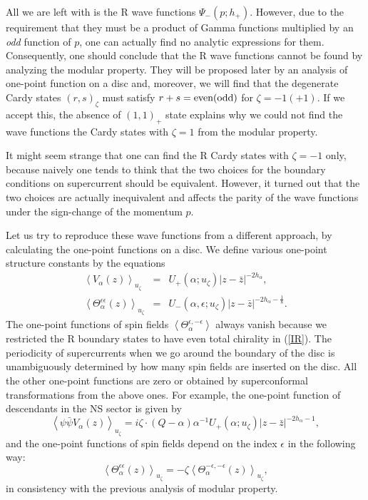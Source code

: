 \documentclass[a4paper,12pt]{article}
\def\subsection#1{\addtocounter{subsection}{1}
    \vskip6mm\noindent{\sc\thesubsection~#1}\vskip4mm}
\newcommand{\vev}[1]{\left<{#1}\right>}
\newcommand{\ep}{{\epsilon}}
\begin{document}
 All we are left with is the R wave functions $\Psi_-(p;h_+)$.
 However, due to the requirement that they must be a product of
 Gamma functions multiplied by an {\it odd} function of $p$,
 one can actually find no analytic expressions for them.
 Consequently, one should conclude that the R 
 wave functions cannot be found by analyzing the modular property.
 They will be proposed later by an analysis of one-point function
 on a disc and, moreover, we will find that the degenerate Cardy
 states $(r,s)_\zeta$ must satisfy $r+s={\rm even(odd)}$ for
 $\zeta=-1(+1)$.
 If we accept this, the absence of $(1,1)_+$ state explains
 why we could not find the wave functions the Cardy states with
 $\zeta=1$ from the modular property.

   It might seem strange that one can find the R Cardy states
 with $\zeta=-1$ only, because naively one tends to think that the two
 choices for the boundary conditions on supercurrent should be
 equivalent.
 However, it turned out that the two choices are actually
 inequivalent and affects the parity of the wave functions
 under the sign-change of the momentum $p$.

\subsection{One-point functions of bulk operators}

   Let us try to reproduce these wave functions from a different
 approach, by calculating the one-point functions on a disc.
 We define various one-point structure constants by the equations
\begin{eqnarray}
  \vev{V_\alpha(z)}_{u_\zeta}
 &=& U_+(\alpha;u_\zeta)|z-\bar{z}|^{-2h_\alpha},
\nonumber \\
  \vev{\Theta_\alpha^{\ep\ep}(z)}_{u_\zeta}
 &=& U_-(\alpha,\ep;u_\zeta)|z-\bar{z}|^{-2h_\alpha-\frac{1}{8}}.
\end{eqnarray}
 The one-point functions of spin fields $\vev{\Theta_\alpha^{\ep,-\ep}}$
 always vanish because we restricted the R boundary states
 to have even total chirality in (\ref{IR}).
 The periodicity of supercurrents when we go around the boundary
 of the disc is unambiguously determined by how many spin fields are
 inserted on the disc.
 All the other one-point functions are zero or obtained 
 by superconformal transformations from the above ones.
 For example, the one-point function of descendants
 in the NS sector is given by
\begin{equation}
  \vev{\psi\bar{\psi}V_\alpha(z)}_{u_\zeta}
 = i\zeta\cdot(Q-\alpha)\alpha^{-1}
   U_+(\alpha;u_\zeta)|z-\bar{z}|^{-2h_\alpha-1},
\end{equation}
 and the one-point functions of spin fields depend on the index $\ep$
 in the following way:
\begin{equation}
  \vev{\Theta_\alpha^{\ep\ep}(z)}_{u_\zeta}
 =-\zeta\vev{\Theta_\alpha^{-\ep,-\ep}(z)}_{u_\zeta},
\label{SeTf}
\end{equation}
 in consistency with the previous analysis of modular property.
\end{document}
